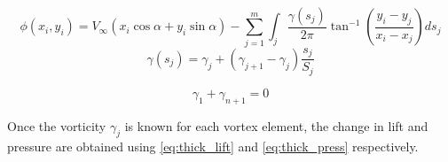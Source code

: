 \begin{equation}
  \label{eq:phi_thick}
    \phi\left(x_{i}, y_{i}\right)=V_{\infty}\left(x_{i} \cos \alpha+y_{i} \sin \alpha\right)-\sum_{j=1}^{m} \int_{j} \frac{\gamma\left(s_{j}\right)}{2 \pi} \tan ^{-1}\left(\frac{y_{i}-y_{j}}{x_{i}-x_{j}}\right) d s_{j}
  \end{equation}
  \begin{equation}
    \gamma\left(s_{j}\right)=\gamma_{j}+\left(\gamma_{j+1}-\gamma_{j}\right) \frac{s_{j}}{S_{j}}
    \end{equation}
\medskip

\citeauthor{kuethe_chow_1998}\cite{kuethe_chow_1998}


\begin{equation}
  \label{eq:kutta2}
      \gamma_1 + \gamma_{n+1} = 0
  \end{equation}

Once the vorticity $\gamma_j$ is known for each vortex element, the change in
lift and pressure are obtained using \autoref{eq:thick_lift} and
\autoref{eq:thick_press} respectively.

